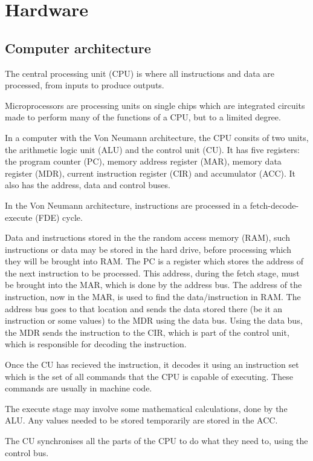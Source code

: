 \section{Hardware}
\subsection{Computer architecture}

The central processing unit (CPU) is where all instructions and data are processed, from inputs
to produce outputs. 

Microprocessors are processing units 
on single chips
which are integrated circuits made to perform many of the
functions of a CPU, but to a limited degree.

In a computer with the Von Neumann architecture, the CPU consits of two units, the arithmetic logic
unit (ALU) and the control unit (CU). It has five registers: the program counter (PC), 
memory address
register (MAR), memory data register (MDR), current instruction register (CIR) and accumulator
(ACC). It also has the address, data and control buses.

In the Von Neumann architecture, instructions are processed in a fetch-decode-execute (FDE) cycle.

Data and instructions stored in the the random access memory (RAM), such instructions or data may
be stored in the hard drive, before processing which they will be brought into RAM. The PC is
a register which stores the address of the next instruction to be processed. This address, during
the fetch stage, must be brought into the MAR, which is done by the address bus. The address of
the instruction, now in the MAR, is used to find the data/instruction in RAM. The address bus
goes to that location and sends the data stored there (be it an instruction or some values) to the
MDR using the data bus. Using the data bus, the MDR sends the instruction to the CIR, which is 
part of the control unit, which is responsible for decoding the instruction.

Once the CU has recieved the instruction, it decodes it using an instruction set which is the set
of all commands that the CPU is capable of executing. These commands are usually in machine code.

The execute stage may involve some mathematical calculations, done by the ALU. Any values needed
to be stored temporarily are stored in the ACC.

The CU synchronises all the parts of the CPU to do what they need to, using the control bus.

